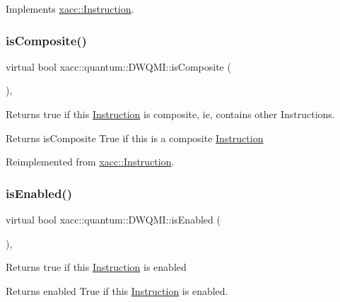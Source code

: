 Implements \hyperlink{a01657_aeb67c67713896e8f27a5c7dd531f3340}{xacc\+::\+Instruction}.

\mbox{\label{a01225_ad2b3b4ee72dee48150bf78d92c52e5e0}} 
\subsubsection{\texorpdfstring{is\+Composite()}{isComposite()}}
{\footnotesize\ttfamily virtual bool xacc\+::quantum\+::\+D\+W\+Q\+M\+I\+::is\+Composite (\begin{DoxyParamCaption}{ }\end{DoxyParamCaption})\hspace{0.3cm}{\ttfamily [inline]}, {\ttfamily [virtual]}}

Returns true if this \hyperlink{a01657}{Instruction} is composite, ie, contains other Instructions.

\begin{DoxyReturn}{Returns}
is\+Composite True if this is a composite \hyperlink{a01657}{Instruction} 
\end{DoxyReturn}


Reimplemented from \hyperlink{a01657_a4383f1036d0fcfe890ab9c613dbd5f38}{xacc\+::\+Instruction}.

\mbox{\label{a01225_aea76901b30d85172ef26fc317b4c0ed7}} 
\subsubsection{\texorpdfstring{is\+Enabled()}{isEnabled()}}
{\footnotesize\ttfamily virtual bool xacc\+::quantum\+::\+D\+W\+Q\+M\+I\+::is\+Enabled (\begin{DoxyParamCaption}{ }\end{DoxyParamCaption})\hspace{0.3cm}{\ttfamily [inline]}, {\ttfamily [virtual]}}

Returns true if this \hyperlink{a01657}{Instruction} is enabled

\begin{DoxyReturn}{Returns}
enabled True if this \hyperlink{a01657}{Instruction} is enabled. 
\end{DoxyReturn}


